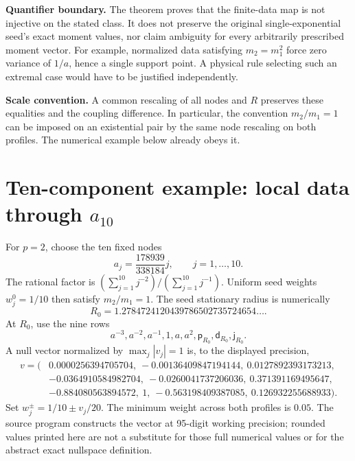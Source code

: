 \documentclass[11pt,letterpaper]{article}
\newcommand{\pker}{\mathsf p}
\newcommand{\jker}{\mathsf j}
\newcommand{\dker}{\mathsf d}
\begin{document}
\textbf{Quantifier boundary.} The theorem proves that the finite-data map is not injective on the stated class. It does not preserve the original single-exponential seed's exact moment values, nor claim ambiguity for every arbitrarily prescribed moment vector. For example, normalized data satisfying $m_2=m_1^2$ force zero variance of $1/a$, hence a single support point. A physical rule selecting such an extremal case would have to be justified independently.

\textbf{Scale convention.} A common rescaling of all nodes and $R$ preserves these equalities and the coupling difference. In particular, the convention $m_2/m_1=1$ can be imposed on an existential pair by the same node rescaling on both profiles. The numerical example below already obeys it.

\section{Ten-component example: local data through \texorpdfstring{$a_{10}$}{a10}}

For $p=2$, choose the ten fixed nodes
\begin{equation}
 a_j=\frac{178939}{338184}j,\qquad j=1,\ldots,10.
\end{equation}
The rational factor is $(\sum_{j=1}^{10}j^{-2})/(\sum_{j=1}^{10}j^{-1})$. Uniform seed weights $w_j^0=1/10$ then satisfy $m_2/m_1=1$. The seed stationary radius is numerically
\begin{equation}
 R_0=1.2784724120439786502735724654\ldots.
\end{equation}
At $R_0$, use the nine rows
\begin{equation}
 a^{-3},a^{-2},a^{-1},1,a,a^2,\pker_{R_0},\dker_{R_0},\jker_{R_0}.
\end{equation}
A null vector normalized by $\max_j|v_j|=1$ is, to the displayed precision,
\begin{align*}
v=(&0.0000256394705704,\ -0.00136409847194144,\ 0.0127892393173213,\\
&-0.0364910584982704,\ -0.0260041737206036,\ 0.371391169495647,\\
&-0.884080563894572,\ 1,\ -0.563198409387085,\ 0.126932255688933).
\end{align*}
Set $w_j^\pm=1/10\pm v_j/20$. The minimum weight across both profiles is $0.05$. The source program constructs the vector at 95-digit working precision; rounded values printed here are not a substitute for those full numerical values or for the abstract exact nullspace definition.
\end{document}
